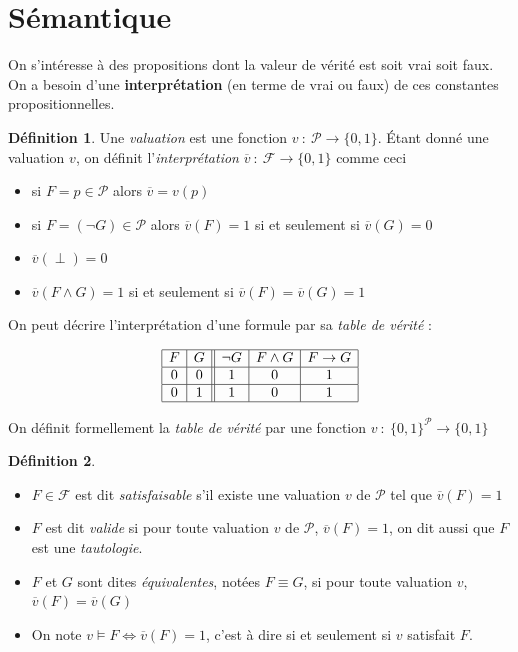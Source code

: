 \documentclass[]{article}
\theoremstyle{remark}
\theoremstyle{definition}
\newtheorem{mydef}{Définition}
\newcommand{\funcshort}[3]{
#1 ~ : ~ #2 \longrightarrow #3
}
\begin{document}
\section{Sémantique}

On s'intéresse à des propositions dont la valeur de vérité est soit vrai soit faux. On a besoin d'une \textbf{interprétation} (en terme de vrai ou faux) de ces constantes propositionnelles.

\begin{mydef}
	Une \textit{valuation} est une fonction $v ~ : ~ \mathcal{P} \longrightarrow \{0, 1\}$.
	Étant donné une valuation $v$, on définit l'\textit{interprétation} $\funcshort{\overline{v}}{\mathcal{F}}{\{0, 1\}}$ comme ceci
	\begin{itemize}
		\item si $F = p \in \mathcal{P}$ alors $\overline{v}=v(p)$
		\item si $F = (\neg G) \in \mathcal{P}$ alors $\overline{v}(F) = 1$ si et seulement si $\overline{v}(G) = 0$
		\item $\overline{v}(\perp)=0$
		\item $\overline{v}(F \land G) = 1$ si et seulement si $\overline{v} (F) = \overline{v} (G) = 1$
	\end{itemize}
\end{mydef}

On peut décrire l'interprétation d'une formule par sa \textit{table de vérité} :

$$
	\begin{array}{|c|c||c|c|c|}
		\hline
		F & G & \neg G & F \land G & F \rightarrow G \\
		\hline
		0 & 0 & 1 & 0 & 1 \\
		\hline
		0 & 1 & 1 & 0 & 1 \\
		\hline
	\end{array}
$$

On définit formellement la \textit{table de vérité} par une fonction $\funcshort{v}{\{0, 1\}^\mathcal{P}}{\{0, 1\}}$

\begin{mydef}
	\leavevmode
	\begin{itemize}
		\item $F \in \mathcal{F}$ est dit \textit{satisfaisable} s'il existe une valuation $v$ de $\mathcal{P}$ tel que $\overline{v}(F)=1$
		\item $F$ est dit \textit{valide} si pour toute valuation $v$ de $\mathcal{P}$, $\overline{v}(F) = 1$, on dit aussi que $F$ est une \textit{tautologie}.
		\item $F$ et $G$ sont dites \textit{équivalentes}, notées $F \equiv G$, si pour toute valuation $v$, $\overline{v}(F)=\overline{v}(G)$
		\item On note $v \models F \Longleftrightarrow \overline{v}(F)=1$, c'est à dire si et seulement si $v$ satisfait $F$.
	\end{itemize}
\end{mydef}
\end{document}
